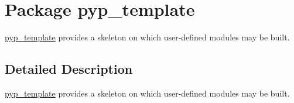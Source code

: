 \hypertarget{namespacepyp__template}{
\section{Package pyp\_\-template}
\label{namespacepyp__template}
}


\hyperlink{namespacepyp__template}{pyp\_\-template} provides a skeleton on which user-\/defined modules may be built.  




\subsection{Detailed Description}
\hyperlink{namespacepyp__template}{pyp\_\-template} provides a skeleton on which user-\/defined modules may be built. 